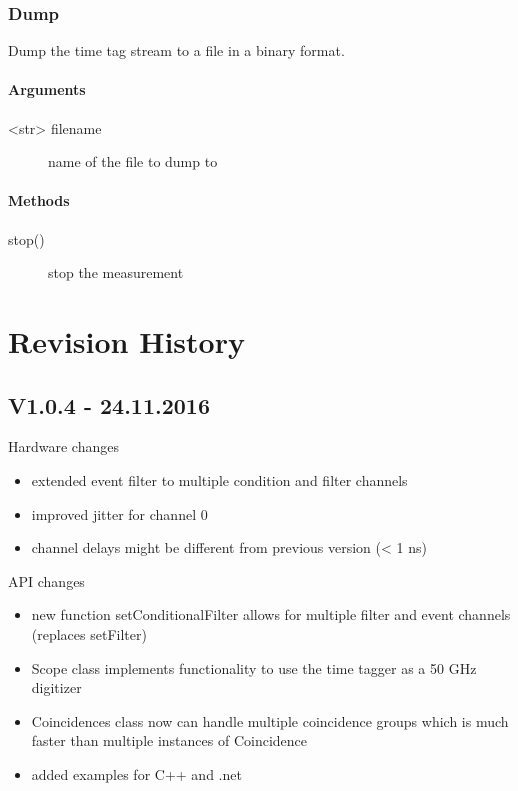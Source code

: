 \documentclass[letterpaper,10pt,english]{sphinxmanual}
\begin{document}
\subsection{Dump}
\label{sections/api:dump}
Dump the time tag stream to a file in a binary format.


\subsubsection{Arguments}
\label{sections/api:id16}\begin{description}
\item[{\textless{}str\textgreater{} filename}] \leavevmode
name of the file to dump to

\end{description}


\subsubsection{Methods}
\label{sections/api:id17}\begin{description}
\item[{stop()}] \leavevmode
stop the measurement

\end{description}


\chapter{Revision History}
\label{sections/changelog:changelog}\label{sections/changelog::doc}\label{sections/changelog:revision-history}

\section{V1.0.4 - 24.11.2016}
\label{sections/changelog:v1-0-4-24-11-2016}
Hardware changes
\begin{itemize}
\item {} 
extended event filter to multiple condition and filter channels

\item {} 
improved jitter for channel 0

\item {} 
channel delays might be different from previous version (\textless{} 1 ns)

\end{itemize}

API changes
\begin{itemize}
\item {} 
new function setConditionalFilter allows for multiple filter and event channels (replaces setFilter)

\item {} 
Scope class implements functionality to use the time tagger as a 50 GHz digitizer

\item {} 
Coincidences class now can handle multiple coincidence groups which is much faster than multiple instances of Coincidence

\item {} 
added examples for C++ and .net

\end{itemize}
\end{document}
